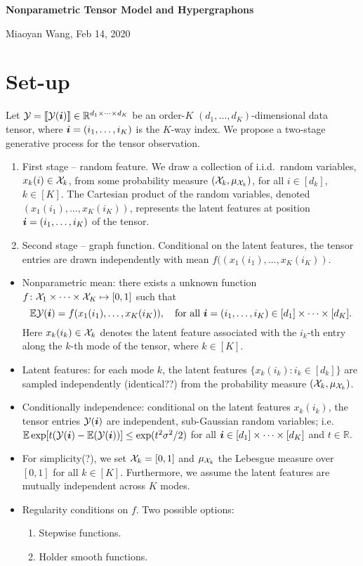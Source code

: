 \documentclass[11pt]{article}
\theoremstyle{plain}
\theoremstyle{definition}
\begin{document}
\begin{center}
{\Large \bf Nonparametric Tensor Model and Hypergraphons}

Miaoyan Wang, Feb 14, 2020
\end{center}


\section{Set-up}\label{sec:model}
Let $\mathcal{Y}=\llbracket \mathcal{Y}(\bm{i}) \rrbracket\in\mathbb{R}^{d_1\times \cdots \times d_K}$ be an order-$K$ $(d_1,\ldots,d_K)$-dimensional data tensor, where $\bm{i}=(i_1,\ldots,i_K)$ is the $K$-way index. We propose a two-stage generative process for the tensor observation. 
\begin{enumerate}
\item First stage -- random feature. We draw a collection of i.i.d.\ random variables, $x_k(i) \in \mathcal{X}_k$, from some probability measure $(\mathcal{X}_k,\mu_{\mathcal{X}_k})$, for all $i\in[d_k]$, $k\in[K]$. The Cartesian product of the random variables, denoted $(x_1(i_1),\ldots,x_K(i_K))$, represents the latent features at position $\bm{i}=(i_1,\dots,i_K)$ of the tensor. 
\item Second stage -- graph function. Conditional on the latent features, the tensor entries are drawn independently with mean $f((x_1(i_1),\ldots,x_K(i_K))$.
\end{enumerate}
\begin{itemize}[label=\textbullet, leftmargin=*]
\item Nonparametric mean: there exists a unknown function $f\colon \mathcal{X}_1\times \cdots \times \mathcal{X}_K \mapsto [0,1]$ such that
\begin{equation}\label{eq:model}
\mathbb{E}\tY(\mi) =f(x_1(i_1),\ldots,x_K(i_K)),\quad \text{for all}\ \mi=(i_1,\ldots,i_K)\in[d_1]\times \cdots \times [d_K].
\end{equation}
Here $x_k(i_k)\in\mathcal{X}_k$ denotes the latent feature associated with the $i_k$-th entry along the $k$-th mode of the tensor, where $k\in[K]$.  
\item Latent features: for each mode $k$, the latent features $\{x_k(i_k)\colon i_k\in[d_k]\}$ are sampled independently {\color{red}(identical??)} from the probability measure $(\mathcal{X}_k,\mu_{\mathcal{X}_k})$.
\item Conditionally independence: conditional on the latent features $x_k(i_k)$, the tensor entries $\mathcal{Y}(\bm{i})$ are independent, sub-Gaussian random variables; i.e. $\mathbb{E}\exp [t(\mathcal{Y}(\bm{i})-\mathbb{E}(\mathcal{Y}(\bm{i}))] \leq \exp(t^2\sigma^2/2)$ for all $\bm{i}\in[d_1]\times \cdots \times[d_K]$ and $t\in\mathbb{R}$.

\item {\color{red}For simplicity}(?), we set $\mathcal{X}_k=[0,1]$ and $\mu_{\mathcal{X}_k}$ the Lebesgue measure over $[0,1]$ for all $k\in[K]$. Furthermore, we assume the latent features are mutually independent across $K$ modes.
\item Regularity conditions on $f$. Two possible options: 
\begin{enumerate}
\item Stepwise functions.
\item Holder smooth functions.
\end{enumerate}
\end{itemize}
\end{document}
